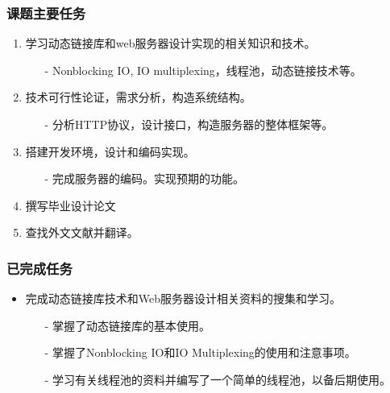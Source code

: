 \documentclass[dvipdfm]{beamer}
\begin{document}
\begin{frame}
	\frametitle{课题主要任务}
	\begin{enumerate}
		\item 学习动态链接库和{\cp web}服务器设计实现的相关知识和技术。
		\begin{itemize}
			\item[-] {\cp Nonblocking IO, IO multiplexing}，线程池，动态链接技术等。
		\end{itemize}
		\pause
		\item 技术可行性论证，需求分析，构造系统结构。
		\begin{itemize}
			\item[-] 分析{\cp HTTP}协议，设计接口，构造服务器的整体框架等。
		\end{itemize}
		\pause
		\item 搭建开发环境，设计和编码实现。
		\begin{itemize}
			\item[-] 完成服务器的编码。实现预期的功能。
		\end{itemize}
		\pause
		\item 撰写毕业设计论文
		\pause
		\item 查找外文文献并翻译。
	\end{enumerate}
\end{frame}

\begin{frame}
	\frametitle{已完成任务}
	\begin{itemize}
		\item 完成动态链接库技术和{\cp Web}服务器设计相关资料的搜集和学习。
		\pause
		\begin{itemize}
			\item[-] 掌握了动态链接库的基本使用。
			\item[-] 掌握了{\cp Nonblocking IO}和{\cp IO Multiplexing}的使用和注意事项。
			\item[-] 学习有关线程池的资料并编写了一个简单的线程池，以备后期使用。
		\end{itemize}
	\end{itemize}
\end{frame}
\end{document}

